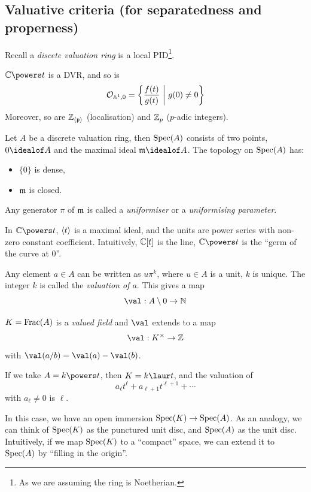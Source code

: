 \documentclass{article}
\begin{document}
\subsection{Valuative criteria (for separatedness and properness)}

Recall a \emph{discete valuation ring} is a local PID\footnote{As we are assuming the ring is Noetherian.}.

\begin{example}
    \(\C\powers t\) is a DVR, and so is
    \[\mathcal{O}_{\mathbb A^1, 0} = \left\{\frac{f(t)}{g(t)} \ \bigg\vert\ g(0) \ne 0\right\}\]
    Moreover, so are \(\mathbb{Z}_{\left\langle \mathfrak{p} \right\rangle}\) (localisation) and \(\mathbb{Z}_p\) (\(p\)-adic integers). 
\end{example}

Let \(A\) be a discrete valuation ring, then \(\operatorname{Spec}(A)\) consists of two points, \(0 \idealof A\) and the maximal ideal \(\mfm \idealof A\). The topology on \(\operatorname{Spec}(A)\) has:
\begin{itemize}
    \item \(\{0\}\) is dense,
    \item \(\mathfrak{m}\) is closed.
\end{itemize}
Any generator \(\pi\) of \(\mathfrak{m}\) is called a \emph{uniformiser} or a \emph{uniformising parameter}.

In \(\C\powers t\), \(\left\langle t \right\rangle\) is a maximal ideal, and the units are power series with non-zero constant coefficient. Intuitively, \(\mathbb{C}[t]\) is the line, \(\C\powers t\) is the ``germ of the curve at \(0\)''.

Any element \(a \in A\) can be written as \(u\pi^k\), where \(u \in A\) is a unit, \(k\) is unique. The integer \(k\) is called the \emph{valuation of \(a\)}. This gives a map
\[\val : A \setminus 0 \to \N\]

\lec

\(K = \operatorname{Frac}(A)\) is a \emph{valued field} and \(\val\) extends to a map
\[\val : K^\times \to \Z\]
with \(\val(a/b) = \val(a) - \val(b)\).

If we take \(A = k\powers t\), then \(K = k\laur t\), and the valuation of
\[a_\ell t^\ell + a_{\ell+1}t^{\ell+1} + \cdots\]
with \(a_\ell \ne 0\) is \(\ell\).

In this case, we have an open immersion \(\operatorname{Spec}(K) \to \operatorname{Spec}(A)\). As an analogy, we can think of \(\operatorname{Spec}(K)\) as the punctured unit disc, and \(\operatorname{Spec}(A)\) as the unit disc. Intuitively, if we map \(\operatorname{Spec}(K)\) to a ``compact'' space, we can extend it to \(\operatorname{Spec}(A)\) by ``filling in the origin''.
\end{document}
